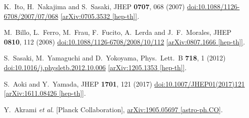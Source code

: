 \documentclass[12pt]{article}
\begin{document}
\begin{thebibliography}{99}
  K.~Ito, H.~Nakajima and S.~Sasaki,
  JHEP {\bf 0707}, 068 (2007)
  \href{https://dx.doi.org/10.1088/1126-6708/2007/07/068}{doi:10.1088/1126-6708/2007/07/068}
  \href{https://arxiv.org/abs/0705.3532}{[arXiv:0705.3532 [hep-th]]}.

  M.~Billo, L.~Ferro, M.~Frau, F.~Fucito, A.~Lerda and J.~F.~Morales,
  JHEP {\bf 0810}, 112 (2008)
  \href{https://dx.doi.org/10.1088/1126-6708/2008/10/112}{doi:10.1088/1126-6708/2008/10/112}
  \href{https://arxiv.org/abs/0807.1666}{[arXiv:0807.1666 [hep-th]]}.

  S.~Sasaki, M.~Yamaguchi and D.~Yokoyama,
  Phys.\ Lett.\ B {\bf 718}, 1 (2012)
  \href{https://dx.doi.org/10.1016/j.physletb.2012.10.006}{doi:10.1016/j.physletb.2012.10.006}
  \href{https://arxiv.org/abs/1205.1353}{[arXiv:1205.1353 [hep-th]]}.

  S.~Aoki and Y.~Yamada,
  JHEP {\bf 1701}, 121 (2017)
  \href{https://dx.doi.org/10.1007/JHEP01(2017)121}{doi:10.1007/JHEP01(2017)121}
  \href{https://arxiv.org/abs/1611.08426}{[arXiv:1611.08426 [hep-th]]}.

  Y.~Akrami {\it et al.} [Planck Collaboration],
  \href{https://arxiv.org/abs/1905.05697}{arXiv:1905.05697 [astro-ph.CO]}.

\end{thebibliography}
\end{document}
